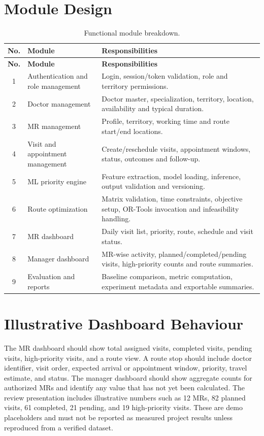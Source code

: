 \documentclass[12pt,a4paper,oneside]{report}
\begin{document}
\section{Module Design}
\begin{longtable}{c p{40mm} p{72mm}}
\caption{Functional module breakdown.}\label{tab:modules}\\
\toprule
\textbf{No.} & \textbf{Module} & \textbf{Responsibilities}\\
\midrule
\endfirsthead
\toprule
\textbf{No.} & \textbf{Module} & \textbf{Responsibilities}\\
\midrule
\endhead
1 & Authentication and role management & Login, session/token validation, role and territory permissions.\\
2 & Doctor management & Doctor master, specialization, territory, location, availability and typical duration.\\
3 & MR management & Profile, territory, working time and route start/end locations.\\
4 & Visit and appointment management & Create/reschedule visits, appointment windows, status, outcomes and follow-up.\\
5 & ML priority engine & Feature extraction, model loading, inference, output validation and versioning.\\
6 & Route optimization & Matrix validation, time constraints, objective setup, OR-Tools invocation and infeasibility handling.\\
7 & MR dashboard & Daily visit list, priority, route, schedule and visit status.\\
8 & Manager dashboard & MR-wise activity, planned/completed/pending visits, high-priority counts and route summaries.\\
9 & Evaluation and reports & Baseline comparison, metric computation, experiment metadata and exportable summaries.\\
\bottomrule
\end{longtable}

\section{Illustrative Dashboard Behaviour}
The MR dashboard should show total assigned visits, completed visits, pending visits, high-priority visits, and a route view. A route stop should include doctor identifier, visit order, expected arrival or appointment window, priority, travel estimate, and status. The manager dashboard should show aggregate counts for authorized MRs and identify any value that has not yet been calculated. The review presentation includes illustrative numbers such as 12 MRs, 82 planned visits, 61 completed, 21 pending, and 19 high-priority visits. These are demo placeholders and must not be reported as measured project results unless reproduced from a verified dataset.
\end{document}
